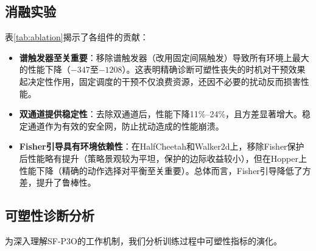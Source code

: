 \documentclass[twocolumn]{article}
\begin{document}
\subsection{消融实验}

\begin{table}[t]
\centering
\caption{消融实验：移除SF-P3O的各个组件（1M步，5个种子）。$\Delta$：与完整SF-P3O的差异。}
\label{tab:ablation}
\end{table}

表\ref{tab:ablation}揭示了各组件的贡献：

\begin{itemize}[leftmargin=*]
    \item \textbf{谱触发器至关重要}：移除谱触发器（改用固定间隔触发）导致所有环境上最大的性能下降（$-347$至$-1208$）。这表明精确诊断可塑性丧失的时机对干预效果起决定性作用，固定调度的干预不仅浪费资源，还因不必要的扰动反而损害性能。

    \item \textbf{双通道提供稳定性}：去除双通道后，性能下降11\%--24\%，且方差显著增大。稳定通道作为有效的安全网，防止扰动造成的性能崩溃。

    \item \textbf{Fisher引导具有环境依赖性}：在HalfCheetah和Walker2d上，移除Fisher保护后性能略有提升（策略景观较为平坦，保护的边际收益较小），但在Hopper上性能下降（精确的动作选择对平衡至关重要）。总体而言，Fisher引导降低了方差，提升了鲁棒性。
\end{itemize}


\subsection{可塑性诊断分析}
\label{sec:diagnostics}

为深入理解SF-P3O的工作机制，我们分析训练过程中可塑性指标的演化。
\end{document}
